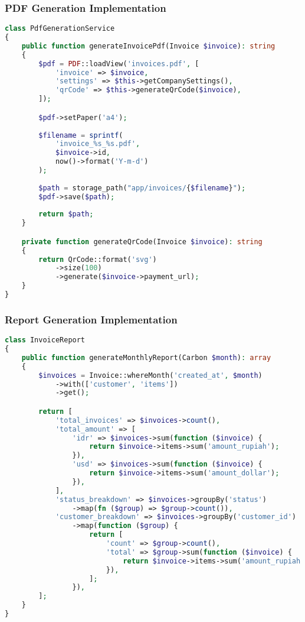 \documentclass[a4paper]{report}
\begin{document}
\subsubsection{PDF Generation Implementation}
\begin{lstlisting}[language=PHP]
class PdfGenerationService
{
    public function generateInvoicePdf(Invoice $invoice): string
    {
        $pdf = PDF::loadView('invoices.pdf', [
            'invoice' => $invoice,
            'settings' => $this->getCompanySettings(),
            'qrCode' => $this->generateQrCode($invoice),
        ]);

        $pdf->setPaper('a4');
        
        $filename = sprintf(
            'invoice_%s_%s.pdf',
            $invoice->id,
            now()->format('Y-m-d')
        );
        
        $path = storage_path("app/invoices/{$filename}");
        $pdf->save($path);
        
        return $path;
    }

    private function generateQrCode(Invoice $invoice): string
    {
        return QrCode::format('svg')
            ->size(100)
            ->generate($invoice->payment_url);
    }
}
\end{lstlisting}

\subsubsection{Report Generation Implementation}
\begin{lstlisting}[language=PHP]
class InvoiceReport
{
    public function generateMonthlyReport(Carbon $month): array
    {
        $invoices = Invoice::whereMonth('created_at', $month)
            ->with(['customer', 'items'])
            ->get();

        return [
            'total_invoices' => $invoices->count(),
            'total_amount' => [
                'idr' => $invoices->sum(function ($invoice) {
                    return $invoice->items->sum('amount_rupiah');
                }),
                'usd' => $invoices->sum(function ($invoice) {
                    return $invoice->items->sum('amount_dollar');
                }),
            ],
            'status_breakdown' => $invoices->groupBy('status')
                ->map(fn ($group) => $group->count()),
            'customer_breakdown' => $invoices->groupBy('customer_id')
                ->map(function ($group) {
                    return [
                        'count' => $group->count(),
                        'total' => $group->sum(function ($invoice) {
                            return $invoice->items->sum('amount_rupiah');
                        }),
                    ];
                }),
        ];
    }
}
\end{lstlisting}
\end{document}
